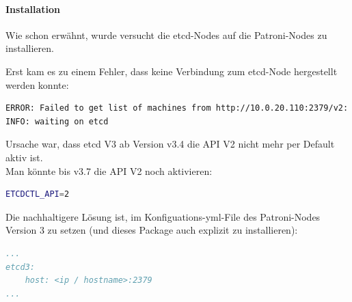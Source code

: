 \recalctypearea
\begin{flushleft}
    \paragraph{Installation}
    \label{par:patroni_installation}
    Wie schon erwähnt, wurde versucht die \gls{etcd}-Nodes auf die Patroni-Nodes zu installieren.
\end{flushleft}
\clearpage
{}
\recalctypearea
\begin{flushleft}
    Erst kam es zu einem Fehler, dass keine Verbindung zum \gls{etcd}-Node hergestellt werden konnte:
\lstset{style=gra_codestyle}
\begin{lstlisting}[language=bash, caption=Patroni - etcd API V2 Error,captionpos=b,label={lst:patroni_etcd_api_v2_error},breaklines=true]
ERROR: Failed to get list of machines from http://10.0.20.110:2379/v2: EtcdException('Bad response : 404 page not found\n')
INFO: waiting on etcd
\end{lstlisting}
    Ursache war, dass \gls{etcd} V3 ab Version v3.4 die API V2 nicht mehr per Default aktiv ist.\\
    Man könnte bis v3.7 die API V2 noch aktivieren:
\lstset{style=gra_codestyle}
\begin{lstlisting}[language=bash, caption=Patroni - etcd API V2 Enable,captionpos=b,label={lst:patroni_etcd_api_v2_enable},breaklines=true]
ETCDCTL_API=2
\end{lstlisting}
    Die nachhaltigere Lösung ist, im Konfiguations-yml-File des Patroni-Nodes Version 3 zu setzen (und dieses Package auch explizit zu installieren):
\lstset{style=gra_codestyle}
\begin{lstlisting}[language=yaml, caption=Patroni - etcd3 Flag,captionpos=b,label={lst:patroni_etcd3_flag},breaklines=true]
...
etcd3:
    host: <ip / hostname>:2379
...
\end{lstlisting}
\end{flushleft}
\clearpage
{}
\recalctypearea
